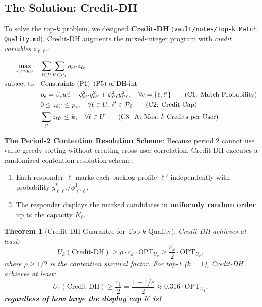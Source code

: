 \documentclass[11pt,letterpaper]{article}
\theoremstyle{definition}
\theoremstyle{plain}
\newtheorem{theorem}{Theorem}[section]
\theoremstyle{remark}
\begin{document}
\subsection{The Solution: Credit-DH}
To solve the top-$k$ problem, we designed \textbf{Credit-DH} (\texttt{vault/notes/Top-k Match Quality.md}). Credit-DH augments the mixed-integer program with \emph{credit variables} $z_{\ell\ell'}$:

\begin{align}
    \max_{x, w, y, z} \quad & \sum_{\ell \in U} \sum_{\ell' \in \mathcal{P}_\ell} q_{\ell\ell'} z_{\ell\ell'} \\
    \text{subject to} \quad & \text{Constraints (P1)–(P5) of DH-int} \notag \\
    & p_e = \beta_e w_e^1 + \phi_{\ell\ell'}^2 y_{\ell\ell'}^2 + \phi_{\ell'\ell}^2 y_{\ell'\ell}^2, \quad \forall e = \{\ell, \ell'\} \tag{C1: Match Probability} \\
    & 0 \le z_{\ell\ell'} \le p_e, \quad \forall \ell \in U, \; \ell' \in \mathcal{P}_\ell \tag{C2: Credit Cap} \\
    & \sum_{\ell'} z_{\ell\ell'} \le k, \quad \forall \ell \in U \tag{C3: At Most $k$ Credits per User}
\end{align}

\noindent \textbf{The Period-2 Contention Resolution Scheme}:
Because period 2 cannot use value-greedy sorting without creating cross-user correlation, Credit-DH executes a randomized contention resolution scheme:
\begin{enumerate}[leftmargin=2em]
    \item Each responder $\ell$ marks each backlog profile $\ell'$ independently with probability $y_{\ell\ell'}^* / \phi_{\ell'\ell}^1$.
    \item The responder displays the marked candidates in \textbf{uniformly random order} up to the capacity $K_\ell$.
\end{enumerate}

\begin{theorem}[Credit-DH Guarantee for Top-$k$ Quality]
Credit-DH achieves at least:
\begin{equation}
    U_k(\text{Credit-DH}) \ge \rho \cdot c_k \cdot \mathrm{OPT}_{U_k} \ge \frac{c_k}{2} \cdot \mathrm{OPT}_{U_k},
\end{equation}
where $\rho \ge 1/2$ is the contention survival factor.
For top-1 ($k=1$), Credit-DH achieves at least:
\begin{equation}
    U_1(\text{Credit-DH}) \ge \frac{c_1}{2} = \frac{1 - 1/e}{2} \approx 0.316 \cdot \mathrm{OPT}_{U_1},
\end{equation}
\textbf{regardless of how large the display cap $K$ is!}
\end{theorem}
\end{document}

